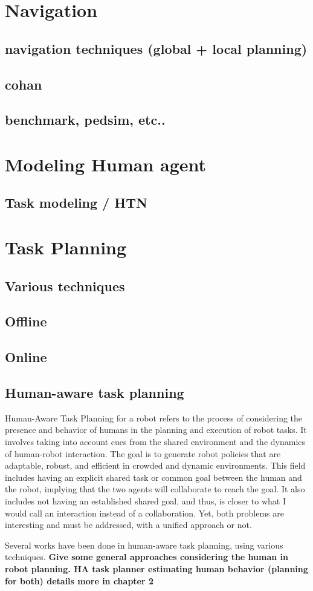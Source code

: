 \section{Navigation}

\subsection{navigation techniques (global + local planning)}
\subsection{cohan}
\subsection{benchmark, pedsim, etc..}


\section{Modeling Human agent}

\subsection{Task modeling / HTN}

\section{Task Planning}

\subsection{Various techniques}
\subsection{Offline}
\subsection{Online}
\subsection{Human-aware task planning}
Human-Aware Task Planning for a robot refers to the process of considering the presence and behavior of humans in the planning and execution of robot tasks. It involves taking into account cues from the shared environment and the dynamics of human-robot interaction. The goal is to generate robot policies that are adaptable, robust, and efficient in crowded and dynamic environments. This field includes having an explicit shared task or common goal between the human and the robot, implying that the two agents will collaborate to reach the goal. It also includes not having an established shared goal, and thus, is closer to what I would call an interaction instead of a collaboration. Yet, both problems are interesting and must be addressed, with a unified approach or not. 

Several works have been done in human-aware task planning, using various techniques.
\textbf{Give some general approaches considering the human in robot planning. HA task planner estimating human behavior (planning for both) details more in chapter 2}

